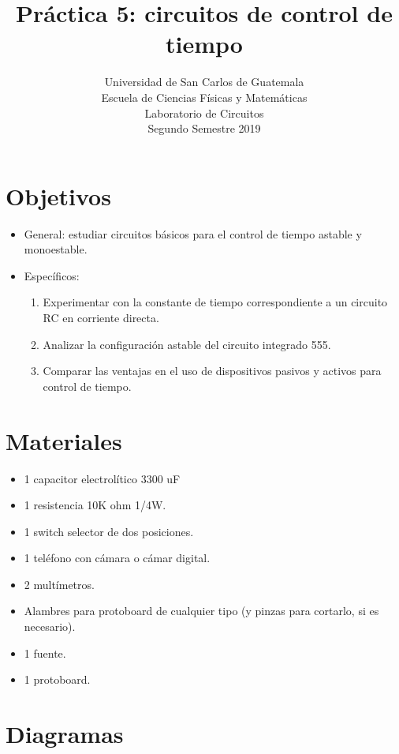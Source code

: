 \documentclass[letterpaper, 12 pt, conference]{ieeeconf}  %
\title{\LARGE \bf
Práctica 5: circuitos de control de tiempo
}
\author{Universidad de San Carlos de Guatemala \\%
Escuela de Ciencias Físicas y Matemáticas\\
Laboratorio de Circuitos\\
Segundo Semestre 2019
}
\begin{document}
\maketitle
\thispagestyle{empty}
\pagestyle{empty}

\section{Objetivos}
\begin{itemize}
    \item General: estudiar circuitos básicos para el control de tiempo astable y monoestable.
    \item Específicos:
    \begin{enumerate}
    \item Experimentar con la constante de tiempo correspondiente a un circuito RC en corriente directa.
    \item Analizar la configuración astable del circuito integrado 555.
    \item Comparar las ventajas en el uso de dispositivos pasivos y activos para control de tiempo.
\end{enumerate}
\end{itemize}


\section{Materiales}
\begin{itemize}
    \item 1  capacitor electrolítico 3300 uF
    \item 1 resistencia 10K ohm 1/4W.
    \item 1 switch selector de dos posiciones.
    \item 1 teléfono con cámara o cámar digital.
    \item 2 multímetros.
    \item Alambres para protoboard de cualquier tipo (y pinzas para cortarlo, si es necesario).
    \item 1 fuente.
    \item 1 protoboard.
\end{itemize}
\pagebreak

\section{Diagramas}
\end{document}
